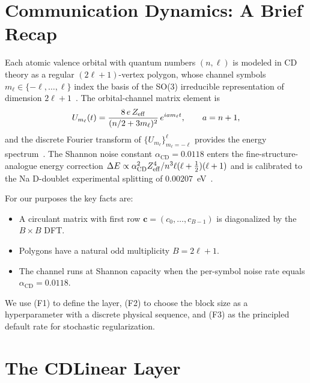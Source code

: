 \documentclass[aps,prx,onecolumn,11pt,nofootinbib,longbibliography]{revtex4-2}
\newcommand{\alphaCD}{\alpha_{\mathrm{CD}}}
\begin{document}
\section{Communication Dynamics: A Brief Recap}
\label{sec:cd-recap}

Each atomic valence orbital with quantum numbers $(n,\ell)$ is modeled in CD
theory as a regular $(2\ell+1)$-vertex polygon, whose channel symbols
$m_\ell \in \{-\ell,\ldots,\ell\}$ index the basis of the SO(3) irreducible
representation of dimension $2\ell+1$~\cite{Pan2021}.  The orbital-channel
matrix element is
\begin{equation}
U_{m_\ell}(t) = \frac{8\,e\,Z_{\rm eff}}{(n/2 + 3 m_\ell)^2}\,e^{i a m_\ell t},
\qquad a = n+1,
\label{eq:U}
\end{equation}
and the discrete Fourier transform of $\{U_{m_\ell}\}_{m_\ell=-\ell}^{\ell}$
provides the energy spectrum~\cite{Pan2021,PaperI}.  The Shannon noise
constant $\alphaCD = 0.0118$ enters the fine-structure-analogue energy
correction
$\Delta E \propto \alphaCD^2 Z_{\rm eff}^4 / n^3 \ell(\ell + \tfrac12)(\ell+1)$
and is calibrated to the Na D-doublet experimental splitting of
$0.00207$~eV~\cite{PaperI}.

For our purposes the key facts are:
\begin{itemize}
\item[(F1)] A circulant matrix with first row
$\mathbf{c} = (c_0,\ldots,c_{B-1})$ is diagonalized by the $B\times B$ DFT.
\item[(F2)] Polygons have a natural odd multiplicity $B = 2\ell+1$.
\item[(F3)] The channel runs at Shannon capacity when the per-symbol noise
rate equals $\alphaCD = 0.0118$.
\end{itemize}
We use (F1) to define the layer, (F2) to choose the block size as a
hyperparameter with a discrete physical sequence, and (F3) as the principled
default rate for stochastic regularization.

\section{The CDLinear Layer}
\label{sec:layer}
\end{document}

